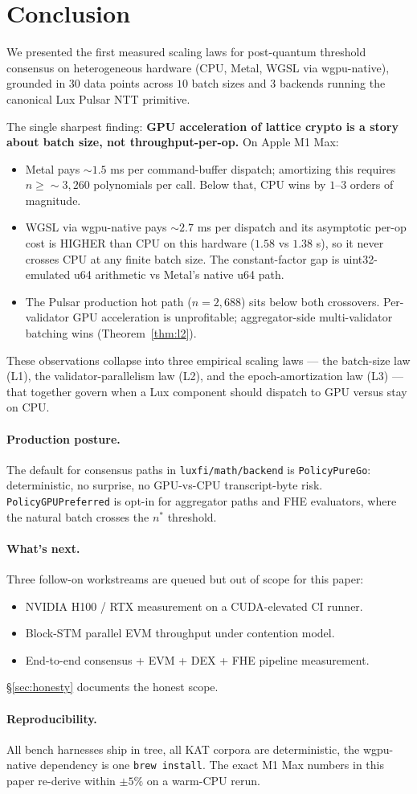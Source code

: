 \section{Conclusion}
\label{sec:conclusion}

We presented the first measured scaling laws for post-quantum
threshold consensus on heterogeneous hardware (CPU, Metal, WGSL via
wgpu-native), grounded in $30$ data points across $10$ batch sizes
and $3$ backends running the canonical Lux Pulsar NTT primitive.

The single sharpest finding: \textbf{GPU acceleration of lattice
crypto is a story about batch size, not throughput-per-op.} On
Apple M1 Max:
\begin{itemize}[nosep]
\item Metal pays $\sim 1.5$ ms per command-buffer dispatch;
amortizing this requires $n \geq \sim 3{,}260$ polynomials per
call. Below that, CPU wins by $1$--$3$ orders of magnitude.
\item WGSL via wgpu-native pays $\sim 2.7$ ms per dispatch and
its asymptotic per-op cost is HIGHER than CPU on this hardware
($1.58$ vs $1.38$ \textmu s), so it never crosses CPU at any
finite batch size. The constant-factor gap is uint32-emulated u64
arithmetic vs Metal's native u64 path.
\item The Pulsar production hot path ($n = 2{,}688$) sits below
both crossovers. Per-validator GPU acceleration is unprofitable;
aggregator-side multi-validator batching wins (Theorem~\ref{thm:l2}).
\end{itemize}

These observations collapse into three empirical scaling laws —
the batch-size law (L1), the validator-parallelism law (L2), and the
epoch-amortization law (L3) — that together govern when a Lux
component should dispatch to GPU versus stay on CPU.

\paragraph{Production posture.}
The default for consensus paths in \texttt{luxfi/math/backend} is
\texttt{PolicyPureGo}: deterministic, no surprise, no GPU-vs-CPU
transcript-byte risk. \texttt{PolicyGPUPreferred} is opt-in for
aggregator paths and FHE evaluators, where the natural batch
crosses the $n^*$ threshold.

\paragraph{What's next.}
Three follow-on workstreams are queued but out of scope for this
paper:
\begin{itemize}[nosep]
\item NVIDIA H100 / RTX measurement on a CUDA-elevated CI runner.
\item Block-STM parallel EVM throughput under contention model.
\item End-to-end consensus + EVM + DEX + FHE pipeline measurement.
\end{itemize}
\S\ref{sec:honesty} documents the honest scope.

\paragraph{Reproducibility.}
All bench harnesses ship in tree, all KAT corpora are
deterministic, the wgpu-native dependency is one
\texttt{brew install}. The exact M1 Max numbers in this paper
re-derive within $\pm 5\%$ on a warm-CPU rerun.
